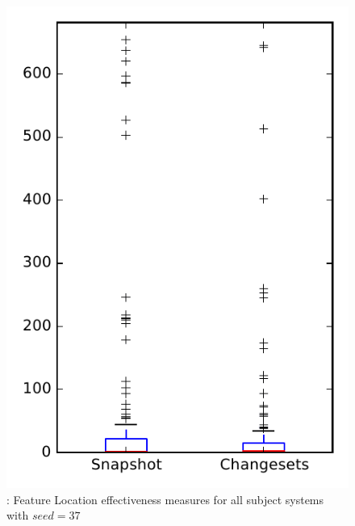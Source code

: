 
\begin{figure}
\centering
\includegraphics[height=0.4\textheight]{figures/flt_seed/rq1_overview_37}
\caption{\rone: Feature Location effectiveness measures for all subject systems with $seed=37$}
\label{fig:flt_seed:rq1:overview}
\end{figure}
